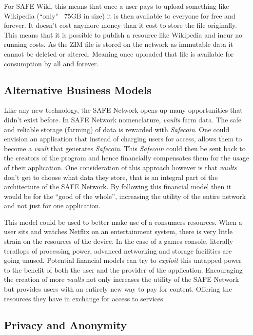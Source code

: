 For SAFE Wiki, this means that once a user pays to upload something like Wikipedia (``only'' ~75GB in size) it is then available to everyone for free and forever. It doesn't cost anymore money than it cost to store the file originally. This means that it is possible to publish a resource like Wikipedia and incur no running costs. As the ZIM file is stored on the network as immutable data it cannot be deleted or altered. Meaning once uploaded that file is available for consumption by all and forever.
 
\subsection{Alternative Business Models}

Like any new technology, the SAFE Network opens up many opportunities that didn't exist before. In SAFE Network nomenclature, \textit{vaults} farm data. The safe and reliable storage (farming) of data is rewarded with \textit{Safecoin}. One could envision an application that instead of charging users for access, allows them to become a \textit{vault} that generates \textit{Safecoin}. This \textit{Safecoin} could then be sent back to the creators of the program and hence financially compensates them for the usage of their application. One consideration of this approach however is that \textit{vaults} don't get to choose what data they store, that is an integral part of the architecture of the SAFE Network. By following this financial model then it would be for the ``good of the whole'', increasing the utility of the entire network and not just for one application.

This model could be used to better make use of a consumers resources. When a user sits and watches Netflix on an entertainment system, there is very little strain on the resources of the device. In the case of a games console, literally teraflops of processing power, advanced networking and storage facilities are going unused. Potential financial models can try to \textit{exploit} this untapped power to the benefit of both the user and the provider of the application. Encouraging the creation of more \textit{vaults} not only increases the utility of the SAFE Network but provides users with an entirely new way to pay for content. Offering the resources they have in exchange for access to services.

\subsection{Privacy and Anonymity}

